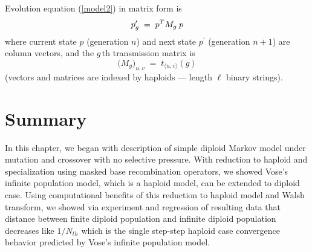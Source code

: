 Evolution equation (\ref{model2}) in matrix form is
\begin{equation}
\label{model3}
p_g^\prime \; = \; p^T M_g \,\hspace{0.01in} p
\end{equation}
where current state $p$ (generation $n$) and next state $p^\prime$
(generation $n+1$) are column vectors, and the $g\,$th transmission
matrix is
\begin{equation} \label{Mg}
\Big(M_g \Big)_{u,v} \; = \; t_{\langle u, v \rangle}(g)
\end{equation}
(vectors and matrices are indexed by haploids --- length $\ell$ binary
strings).





\section{Summary}
In this chapter, we began with description of simple diploid Markov model under mutation and crossover with no selective pressure. With reduction to haploid and specialization using masked base recombination operators, we showed Vose's infinite population model, which is a haploid model, can be extended to diploid case. Using computational benefits of this reduction to haploid model and Walsh transform, we showed via experiment and regression of resulting data that distance between finite diploid population and infinite diploid population decreases like $1/N_{th}$ which is the single step-step haploid case convergence behavior predicted by Vose's infinite population model.







